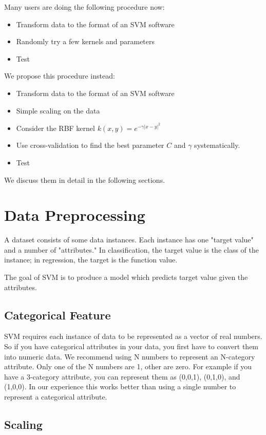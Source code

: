 \documentclass[12pt]{article}
\begin{document}
Many users are doing the following procedure now:
\begin{itemize}
\item Transform data to the format of an SVM software
\item Randomly try a few kernels and parameters
\item Test
\end{itemize}

We propose this procedure instead:
\begin{itemize}
\item Transform data to the format of an SVM software
\item Simple scaling on the data
\item Consider the RBF kernel $k(x,y)=e^{-\gamma|x-y|^2}$ 
\item Use cross-validation to find the best parameter
      $C$ and $\gamma$ systematically.
\item Test
\end{itemize}

We discuss them in detail in the following 
sections.

\section{Data Preprocessing}

A dataset consists of some data instances. Each
instance has one "target value" and a number of
"attributes." In classification, the target value 
is the class of the instance; in regression, 
the target is the function value.

The goal of SVM is to produce a model which 
predicts target value given the attributes.

\subsection{Categorical Feature}

SVM requires each instance of data to be represented
as a vector of real numbers. So if you have categorical
attributes in your data, you first have to convert 
them into numeric data. We recommend using N numbers to 
represent an N-category attribute. Only one of the N
numbers are 1, other are zero. For example if you have
a 3-category attribute, you can represent them as (0,0,1),
(0,1,0), and (1,0,0). In our experience this works
better than using a single number to represent a 
categorical attribute.

\subsection{Scaling}
\end{document}
